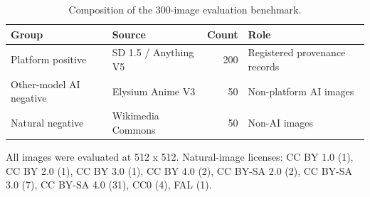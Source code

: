 \begin{table}[t]
\centering
\caption{Composition of the 300-image evaluation benchmark.}
\label{tab:dataset}
\begin{tabular}{l l r l}
\toprule
Group & Source & Count & Role \\
\midrule
Platform positive & SD 1.5 / Anything V5 & 200 & Registered provenance records \\
Other-model AI negative & Elysium Anime V3 & 50 & Non-platform AI images \\
Natural negative & Wikimedia Commons & 50 & Non-AI images \\
\bottomrule
\end{tabular}
\par\smallskip
\footnotesize All images were evaluated at 512 x 512. Natural-image licenses: CC BY 1.0 (1), CC BY 2.0 (1), CC BY 3.0 (1), CC BY 4.0 (2), CC BY-SA 2.0 (2), CC BY-SA 3.0 (7), CC BY-SA 4.0 (31), CC0 (4), FAL (1).
\end{table}
